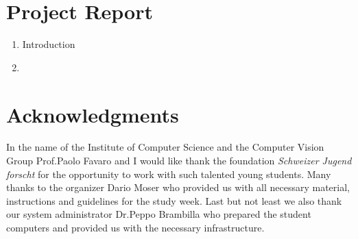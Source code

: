 \documentclass[a4paper]{article}
\begin{document}
\section{Project Report}

	\begin{enumerate}
		\item Introduction
		\item 
	\end{enumerate}

\section{Acknowledgments}
	In the name of the Institute of Computer Science and the Computer Vision Group Prof.\@ Paolo Favaro and I would like thank the foundation \emph{Schweizer Jugend forscht} for the opportunity to work with such talented young students. 
	Many thanks to the organizer Dario Moser who provided us with all necessary material, instructions and guidelines for the study week.
	Last but not least we also thank our system administrator Dr.\@ Peppo Brambilla who prepared the student computers and provided us with the necessary infrastructure.
	
\end{document}
